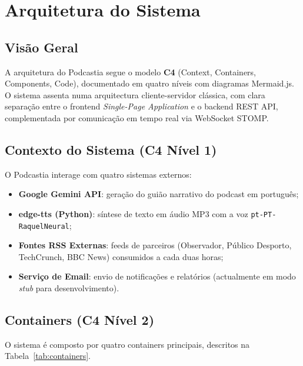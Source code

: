 \documentclass[12pt, a4paper]{report}
\begin{document}
\chapter{Arquitetura do Sistema}
\label{chap:arquitetura}

\section{Visão Geral}

A arquitetura do Podcastia segue o modelo \textbf{C4} (Context, Containers,
Components, Code), documentado em quatro níveis com diagramas Mermaid.js.
O sistema assenta numa arquitectura cliente-servidor clássica, com clara separação
entre o frontend \emph{Single-Page Application} e o backend REST API, complementada
por comunicação em tempo real via WebSocket STOMP.

\section{Contexto do Sistema (C4 Nível 1)}

O Podcastia interage com quatro sistemas externos:

\begin{itemize}
  \item \textbf{Google Gemini API}: geração do guião narrativo do podcast em português;
  \item \textbf{edge-tts (Python)}: síntese de texto em áudio MP3 com a voz \texttt{pt-PT-RaquelNeural};
  \item \textbf{Fontes RSS Externas}: feeds de parceiros (Observador, Público Desporto, TechCrunch, BBC News) consumidos a cada duas horas;
  \item \textbf{Serviço de Email}: envio de notificações e relatórios (actualmente em modo \emph{stub} para desenvolvimento).
\end{itemize}

\section{Containers (C4 Nível 2)}

O sistema é composto por quatro containers principais, descritos na
Tabela~\ref{tab:containers}.
\end{document}
